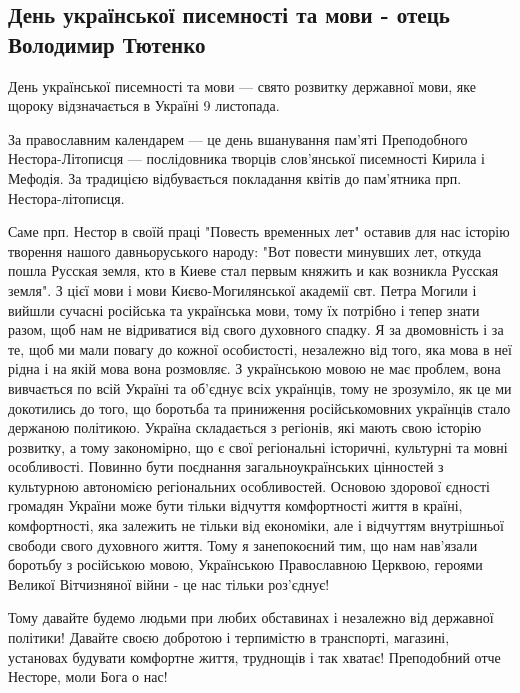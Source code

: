  
 
 

\subsection{День української писемності та мови - отець Володимир Тютенко}
\label{sec:09_11_2020.fb.vladimir_tutenko.1.mova_nestor}

День української писемності та мови --- свято розвитку державної мови, яке щороку
відзначається в Україні 9 листопада. 

За православним календарем --- це день вшанування пам'яті Преподобного
Нестора-Літописця --- послідовника творців слов'янської писемності Кирила і
Мефодія.  За традицією відбувається покладання квітів до пам'ятника прп.
Нестора-літописця. 

Саме прп. Нестор в своїй праці "Повесть временных лет" оставив для нас історію
творення нашого давньоруського народу: "Вот повести минувших лет, откуда пошла
Русская земля, кто в Киеве стал первым княжить и как возникла Русская земля". З
цієї мови і мови Києво-Могилянської академії свт. Петра Могили і вийшли сучасні
російська та українська мови, тому їх потрібно і тепер знати разом, щоб нам не
відриватися від свого духовного спадку. Я за двомовність і за те, щоб ми мали
повагу до кожної особистості, незалежно від того, яка мова в неї рідна і на
якій мова вона розмовляє. З українською мовою не має проблем, вона вивчається
по всій Україні та об'єднує всіх українців, тому не зрозуміло, як це ми
докотились до того, що боротьба та приниження  російськомовних українців стало
держаною політикою. Україна складається з регіонів, які мають свою історію
розвитку, а тому закономірно, що є свої регіональні історичні, культурні та
мовні особливості. Повинно бути поєднання загальноукраїнських цінностей з
культурною автономією регіональних  особливостей.  Основою здорової єдності
громадян України може бути тільки  відчуття комфортності життя в країні,
комфортності, яка залежить не тільки від економіки, але і відчуттям внутрішньої
свободи свого духовного життя. Тому я занепокоєний тим, що нам нав'язали
боротьбу з російською мовою, Українською Православною Церквою, героями Великої
Вітчизняної війни - це нас тільки роз'єднує!  

Тому давайте будемо людьми при любих обставинах і незалежно від державної
політики! Давайте своєю добротою і терпимістю в транспорті, магазині, установах
будувати комфортне життя, труднощів і так хватає!  Преподобний отче Несторе,
моли Бога о нас!
